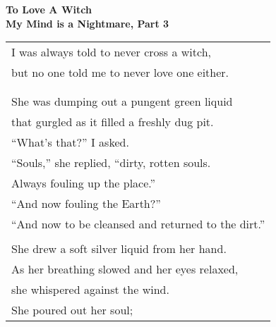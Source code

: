 \documentclass{article}
\begin{document}
\newcommand{\h}{\hspace*{4ex}}


\begin{center}
\textbf{To Love A Witch} \\ %
{\small\textbf{My Mind is a Nightmare, Part 3}} \\
\vspace*{2ex}
\begin{tabular}{l}
I was always told to never cross a witch, \\
but no one told me to never love one either. \\
\\
\\
She was dumping out a pungent green liquid \\ %
that gurgled as it filled a freshly dug pit. \\
\h ``What's that?'' I asked. \\
``Souls,'' she replied, ``dirty, rotten souls. \\
Always fouling up the place.'' \\
\h ``And now fouling the Earth?'' \\
``And now to be cleansed and returned to the dirt.'' \\
\\
She drew a soft silver liquid from her hand. \\
As her breathing slowed and her eyes relaxed, \\
she whispered against the wind. \\
She poured out her soul; \\

\end{tabular}
\end{center}
\end{document}
